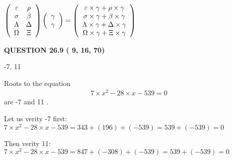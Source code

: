 \documentclass[12pt]{article}
\begin{document}
$  %
 \left( \begin{array}
 {
 c
 c
 }
 \varepsilon & 
 \rho \\ 
 \sigma & 
 \beta \\ 
 \Lambda & 
 \Delta \\ 
 \Omega & 
                    \Xi
 \end{array} \right)
 \left( \begin{array}
 {
 c
 }
 \gamma \\ 
 \gamma
 \end{array} \right)
=
  \left( \begin{array}
 {
 c
 }
 \varepsilon \times  \gamma   +  \rho \times  \gamma \\ 
 \sigma \times  \gamma   +  \beta \times  \gamma \\ 
 \Lambda \times  \gamma   +  \Delta \times  \gamma \\ 
 \Omega \times  \gamma   +                     \Xi \times  \gamma
 \end{array} \right)
$
 
 
 
 
 
\noindent{}

 
 
  
\vspace{0.2in}
  
{\textbf{\Large{QUESTION
26.9 
 (          9,         16,         70)
}}}
  
  


 
 
\noindent{}

-7,  %
11
 
 
 
 
 
\noindent{}

Roots to the equation
\begin{eqnarray*}
7 \times x^2  %
-28
                 \times x    %
-539 =0
\end{eqnarray*}
are  %
-7 and  %
11 .
 
Let us verity  %
-7 first:
$  %
7 \times x^2  %
-28
                 \times x    %
-539
  = %
343+( %
196)+( %
-539)
  = %
539+( %
-539)
  = %
0
$
 
Then verity  %
11:
$  %
7 \times x^2  %
-28
                 \times x    %
-539
  = %
847+( %
-308)+( %
-539)
  = %
539+( %
-539)
  = %
0
$
 
\end{document}
